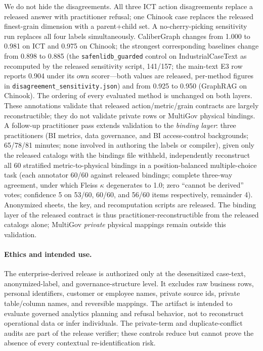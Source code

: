 \documentclass[letterpaper]{article}
\begin{document}
We do not hide the disagreements. All three ICT action disagreements replace a released answer with practitioner refusal; one Chinook case replaces the released finest-grain dimension with a parent+child set. A no-cherry-picking sensitivity run replaces all four labels simultaneously. CaliberGraph changes from 1.000 to 0.981 on ICT and 0.975 on Chinook; the strongest corresponding baselines change from 0.898 to 0.885 (the \texttt{safenlidb\_guarded} control on IndustrialCaseText as recomputed by the released sensitivity script, 141/157; the main-text E3 row reports 0.904 under its own scorer---both values are released, per-method figures in \texttt{disagreement\_sensitivity.json}) and from 0.925 to 0.950 (GraphRAG on Chinook). The ordering of every evaluated method is unchanged on both layers. These annotations validate that released action/metric/grain contracts are largely reconstructible; they do not validate private rows or MultiGov physical bindings. A follow-up practitioner pass extends validation to the \emph{binding layer}: three practitioners (BI metrics, data governance, and BI access-control backgrounds; 65/78/81 minutes; none involved in authoring the labels or compiler), given only the released catalogs with the bindings file withheld, independently reconstruct all 60 stratified metric-to-physical bindings in a position-balanced multiple-choice task (each annotator 60/60 against released bindings; complete three-way agreement, under which Fleiss $\kappa$ degenerates to 1.0; zero ``cannot be derived'' votes; confidence 5 on 53/60, 60/60, and 56/60 items respectively, remainder 4). Anonymized sheets, the key, and recomputation scripts are released. The binding layer of the released contract is thus practitioner-reconstructible from the released catalogs alone; MultiGov \emph{private} physical mappings remain outside this validation.

\paragraph{Ethics and intended use.}
The enterprise-derived release is authorized only at the desensitized case-text, anonymized-label, and governance-structure level. It excludes raw business rows, personal identifiers, customer or employee names, private source ids, private table/column names, and reversible mappings. The artifact is intended to evaluate governed analytics planning and refusal behavior, not to reconstruct operational data or infer individuals. The private-term and duplicate-conflict audits are part of the release verifier; these controls reduce but cannot prove the absence of every contextual re-identification risk.
\end{document}
